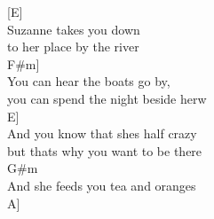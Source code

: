 \documentclass[
  letterpaper,
  a5paper]{memoir}
\begin{document}
{[}E{]}~~~~~~~~~~~~~~\\
Suzanne takes you down\\
to her place by the river\\
\hspace*{0.333em}\hspace*{0.333em}\hspace*{0.333em}\hspace*{0.333em}\hspace*{0.333em}\hspace*{0.333em}\hspace*{0.333em}\hspace*{0.333em}{[}F\#m{]}~~~~~~~~~~~\\
You can hear the boats go by,\\
you can spend the night beside herw\\
\hspace*{0.333em}\hspace*{0.333em}\hspace*{0.333em}\hspace*{0.333em}\hspace*{0.333em}\hspace*{0.333em}\hspace*{0.333em}\hspace*{0.333em}\hspace*{0.333em}{[}E{]}~~~~~~~~~~~~~~~~~~~\\
And you know that she\textquotesingle s half crazy\\
but that\textquotesingle s why you want to be there\\
\hspace*{0.333em}\hspace*{0.333em}\hspace*{0.333em}\hspace*{0.333em}\hspace*{0.333em}\hspace*{0.333em}\hspace*{0.333em}\hspace*{0.333em}\hspace*{0.333em}G\#m~~~~~~~~~~~~\\
And she feeds you tea and oranges\\
\hspace*{0.333em}\hspace*{0.333em}\hspace*{0.333em}\hspace*{0.333em}\hspace*{0.333em}\hspace*{0.333em}\hspace*{0.333em}\hspace*{0.333em}\hspace*{0.333em}\hspace*{0.333em}{[}A{]}~~~~~~~~~~~~~~~\\
\end{document}
